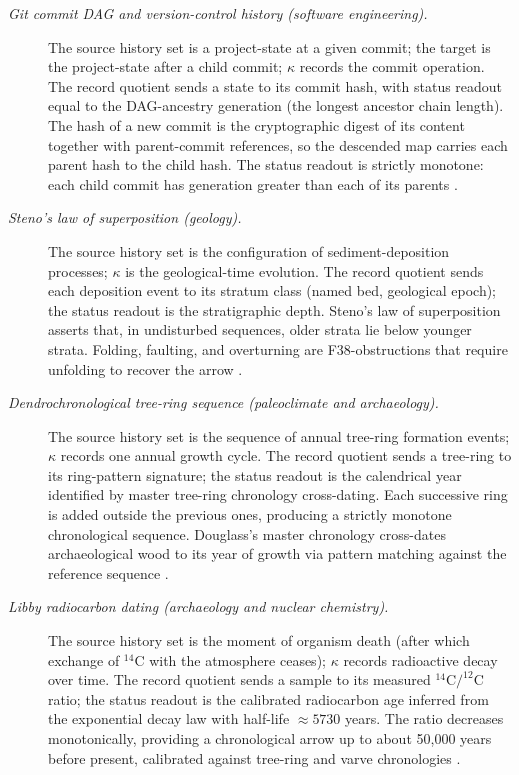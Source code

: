 \documentclass[11pt]{article}
\theoremstyle{definition}
\begin{document}
\begin{description}
\item[\emph{Git commit {DAG} and version-control history
(software engineering).}]
The source history set is a project-state at a given
commit; the target is the project-state after a child
commit; \(\kappa\) records the commit operation.  The
record quotient sends a state to its commit hash, with
status readout equal to the DAG-ancestry generation
(the longest ancestor chain length).  The hash of a
new commit is the cryptographic digest of its content
together with parent-commit references, so the
descended map carries each parent hash to the child
hash.  The status readout is strictly monotone: each
child commit has generation greater than each of its
parents \citep{ChaconStraub2014ProGit}.

\item[\emph{Steno's law of superposition (geology).}]
The source history set is the configuration of
sediment-deposition processes; \(\kappa\) is the
geological-time evolution.  The record quotient sends
each deposition event to its stratum class (named bed,
geological epoch); the status readout is the
stratigraphic depth.  Steno's law of superposition
asserts that, in undisturbed sequences, older strata
lie below younger strata.  Folding, faulting, and
overturning are F38-obstructions that require
unfolding to recover the arrow \citep{Steno1669Prodromus}.

\item[\emph{Dendrochronological tree-ring sequence
(paleoclimate and archaeology).}]
The source history set is the sequence of annual
tree-ring formation events; \(\kappa\) records one
annual growth cycle.  The record quotient sends a
tree-ring to its ring-pattern signature; the status
readout is the calendrical year identified by master
tree-ring chronology cross-dating.  Each successive
ring is added outside the previous ones, producing a
strictly monotone chronological sequence.  Douglass's
master chronology cross-dates archaeological wood to
its year of growth via pattern matching against the
reference sequence \citep{Douglass1919ClimaticCycles}.

\item[\emph{Libby radiocarbon dating (archaeology and
nuclear chemistry).}]
The source history set is the moment of organism death
(after which exchange of \(^{14}\)C with the atmosphere
ceases); \(\kappa\) records radioactive decay over
time.  The record quotient sends a sample to its
measured \(^{14}\)C\(/^{12}\)C ratio; the status readout
is the calibrated radiocarbon age inferred from the
exponential decay law with half-life \(\approx 5730\)
years.  The ratio decreases monotonically, providing a
chronological arrow up to about 50{,}000 years before
present, calibrated against tree-ring and varve
chronologies \citep{Libby1955RadiocarbonDating}.


\end{description}
\end{document}
